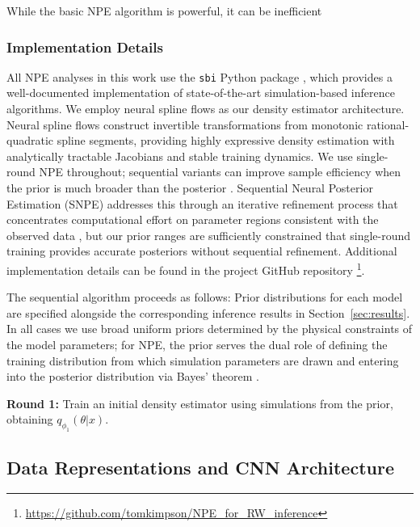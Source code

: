 \documentclass{article}
\providecommand{\DIFaddtex}[1]{{\protect\color{blue} \sf #1}} %
\providecommand{\DIFdeltex}[1]{{\protect\color{red} \scriptsize #1}} %
\providecommand{\DIFaddbegin}{} %
\providecommand{\DIFaddend}{} %
\providecommand{\DIFdelbegin}{} %
\providecommand{\DIFdelend}{} %
\providecommand{\DIFadd}[1]{\texorpdfstring{\DIFaddtex{#1}}{#1}} %
\providecommand{\DIFdel}[1]{\texorpdfstring{\DIFdeltex{#1}}{}} %
\newcommand{\DIFscaledelfig}{0.5}
\newlength{\DIFdelgraphicswidth} %
\newlength{\DIFdelgraphicsheight} %
\newcommand{\DIFaddincludegraphics}[2][]{{\color{blue}\fbox{\DIFOincludegraphics[#1]{#2}}}} %
\newcommand{\DIFdelincludegraphics}[2][]{%
\sbox{\DIFdelgraphicsbox}{\DIFOincludegraphics[#1]{#2}}%
\settoboxwidth{\DIFdelgraphicswidth}{\DIFdelgraphicsbox} %
\settoboxtotalheight{\DIFdelgraphicsheight}{\DIFdelgraphicsbox} %
\scalebox{\DIFscaledelfig}{%
\parbox[b]{\DIFdelgraphicswidth}{\usebox{\DIFdelgraphicsbox}\\[-\baselineskip] \rule{\DIFdelgraphicswidth}{0em}}\llap{\resizebox{\DIFdelgraphicswidth}{\DIFdelgraphicsheight}{%
\setlength{\unitlength}{\DIFdelgraphicswidth}%
\begin{picture}(1,1)%
\thicklines\linethickness{2pt} %
{\color[rgb]{1,0,0}\put(0,0){\framebox(1,1){}}}%
{\color[rgb]{1,0,0}\put(0,0){\line( 1,1){1}}}%
{\color[rgb]{1,0,0}\put(0,1){\line(1,-1){1}}}%
\end{picture}%
}\hspace*{3pt}}} %
} %
\DeclareRobustCommand{\DIFaddbegin}{\DIFOaddbegin \let\includegraphics\DIFaddincludegraphics} %
\DeclareRobustCommand{\DIFaddend}{\DIFOaddend \let\includegraphics\DIFOincludegraphics} %
\DeclareRobustCommand{\DIFdelbegin}{\DIFOdelbegin \let\includegraphics\DIFdelincludegraphics} %
\DeclareRobustCommand{\DIFdelend}{\DIFOaddend \let\includegraphics\DIFOincludegraphics} %
\begin{document}
\DIFdelbegin \DIFdel{While the basic NPE algorithm is powerful, it can be inefficient }\DIFdelend \DIFaddbegin \subsubsection{\DIFadd{Implementation Details}}

\DIFadd{All NPE analyses in this work use the \texttt{sbi} Python package \cite{Boelts2025sbi}, which provides a well-documented implementation of state-of-the-art simulation-based inference algorithms. We employ neural spline flows \cite{durkan2019neural} as our density estimator architecture. Neural spline flows construct invertible transformations from monotonic rational-quadratic spline segments, providing highly expressive density estimation with analytically tractable Jacobians and stable training dynamics. We use single-round NPE throughout; sequential variants \citep{papamakarios2016fast, greenberg2019automatic} can improve sample efficiency }\DIFaddend when the prior is much broader than the posterior\DIFdelbegin \DIFdel{. Sequential Neural Posterior Estimation (SNPE) \citep{papamakarios2016fast, greenberg2019automatic} addresses this through an iterative refinement process that concentrates computational effort on parameter regions consistent with the observed data}\DIFdelend \DIFaddbegin \DIFadd{, but our prior ranges are sufficiently constrained that single-round training provides accurate posteriors without sequential refinement. Additional implementation details can be found in the project GitHub repository }\footnote{\href{github.com/tomkimpson/NPE_for_RW_inference}{\DIFadd{https://github.com/tomkimpson/NPE\_for\_RW\_inference}}}\DIFaddend .

\DIFdelbegin \DIFdel{The sequential algorithm proceeds as follows:
}\DIFdelend \DIFaddbegin \DIFadd{Prior distributions for each model are specified alongside the corresponding inference results in Section~\ref{sec:results}. In all cases we use broad uniform priors determined by the physical constraints of the model parameters; for NPE, the prior serves the dual role of defining the training distribution from which simulation parameters are drawn and entering into the posterior distribution via Bayes' theorem \citep{Gelman1995,Gelman2017}.
}\DIFaddend 



\DIFdelbegin %
\DIFdel{\textbf{Round 1:} Train an initial density estimator using simulations from the prior, obtaining $q_{\phi_1}(\theta | x)$. }\DIFdelend \DIFaddbegin \subsection{\DIFadd{Data Representations and CNN Architecture}}\label{sec:data_architecture}
\DIFaddend 
\end{document}
